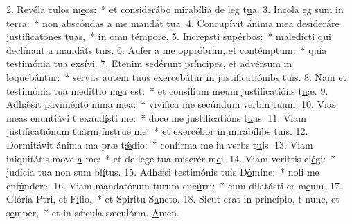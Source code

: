 2. Revéla culos m\uline{e}os:~* et considerábo mirabília de leg t\uline{u}a.
3. Incola eg sum in t\uline{e}rra:~* non abscóndas a me mandát t\uline{u}a.
4. Concupívit ánima mea desideráre justificatónes t\uline{u}as,~* in omn t\uline{é}mpore.
5. Increpsti sup\uline{é}rbos:~* maledícti qui declínant a mandáts t\uline{u}is.
6. Aufer a me oppróbrim, et cont\uline{é}mptum:~* quia testimónia tua exs\uline{í}vi.
7. Etenim sedérunt príncipes, et advérsum m loqueb\uline{á}ntur:~* servus autem tuus exercebátur in justificatiónibs t\uline{u}is.
8. Nam et testimónia tua medittio m\uline{e}a est:~* et consílium meum justificatións t\uline{u}æ.
9. Adhǽsit paviménto nima m\uline{e}a:~* vivífica me secúndum verbm t\uline{u}um.
10. Vias meas enuntiávi t exaud\uline{í}sti me:~* doce me justificatións t\uline{u}as.
11. Viam justificatiónum tuárm ínstru\uline{e} me:~* et exercébor in mirabílibs t\uline{u}is.
12. Dormitávit ánima ma præ t\uline{ǽ}dio:~* confírma me in verbs t\uline{u}is.
13. Viam iniquitátis move \uline{a} me:~* et de lege tua miserér m\uline{e}i.
14. Viam verittis el\uline{é}gi:~* judícia tua non sum bl\uline{í}tus.
15. Adhǽsi testimónis tuis D\uline{ó}mine:~* noli me cnf\uline{ú}ndere.
16. Viam mandatórum turum cuc\uline{ú}rri:~* cum dilatásti cr m\uline{e}um.
17. Glória Ptri, et F\uline{í}lio,~* et Spirítu S\uline{a}ncto.
18. Sicut erat in princípio, t nunc, et s\uline{e}mper,~* et in sǽcula sæculórm. \uline{A}men.
